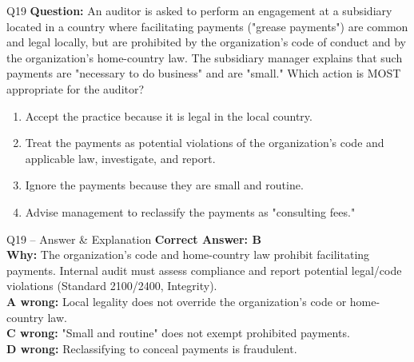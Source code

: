 \documentclass[aspectratio=169,10pt]{beamer}
\begin{document}
	\begin{frame}[t]{Q19}
		\small
		\textbf{Question:} An auditor is asked to perform an engagement at a subsidiary located in a country where facilitating payments ("grease payments") are common and legal locally, but are prohibited by the organization's code of conduct and by the organization's home-country law. The subsidiary manager explains that such payments are "necessary to do business" and are "small." Which action is MOST appropriate for the auditor?
		\begin{enumerate}[label=\Alph*.,itemsep=1pt,topsep=2pt]
			\item Accept the practice because it is legal in the local country.
			\item Treat the payments as potential violations of the organization's code and applicable law, investigate, and report.
			\item Ignore the payments because they are small and routine.
			\item Advise management to reclassify the payments as "consulting fees."
		\end{enumerate}
	\end{frame}
	
	\begin{frame}[t]{Q19 -- Answer \& Explanation}
		\small
		\textbf{Correct Answer: B} \\[4pt]
		\textbf{Why:} The organization's code and home-country law prohibit facilitating payments. Internal audit must assess compliance and report potential legal/code violations (Standard 2100/2400, Integrity). \\[4pt]
		\textbf{A wrong:} Local legality does not override the organization's code or home-country law. \\[2pt]
		\textbf{C wrong:} "Small and routine" does not exempt prohibited payments. \\[2pt]
		\textbf{D wrong:} Reclassifying to conceal payments is fraudulent.
	\end{frame}
	
\end{document}

